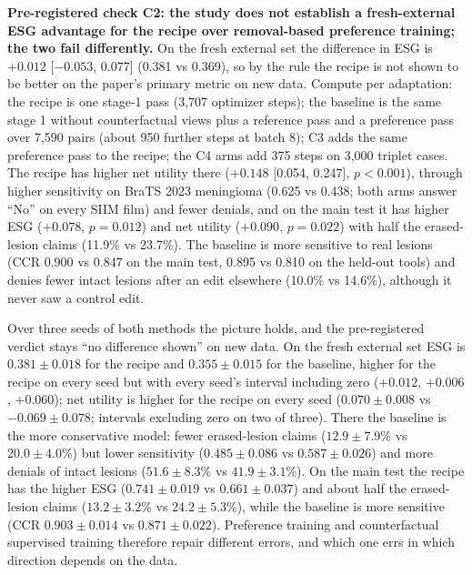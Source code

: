\documentclass[11pt]{article}
\begin{document}
\textbf{Pre-registered check C2: the study does not establish a fresh-external ESG advantage for the recipe over removal-based preference training; the two fail differently.} On the fresh external set the difference in ESG is $+0.012$ [$-0.053$, 0.077] (0.381 vs 0.369), so by the rule the recipe is not shown to be better on the paper's primary metric on new data. Compute per adaptation: the recipe is one stage-1 pass (3,707 optimizer steps); the baseline is the same stage 1 without counterfactual views plus a reference pass and a preference pass over 7,590 pairs (about 950 further steps at batch 8); C3 adds the same preference pass to the recipe; the C4 arms add 375 steps on 3,000 triplet cases. The recipe has higher net utility there ($+0.148$ [0.054, 0.247], $p<0.001$), through higher sensitivity on BraTS 2023 meningioma (0.625 vs 0.438; both arms answer ``No'' on every SIIM film) and fewer denials, and on the main test it has higher ESG ($+0.078$, $p=0.012$) and net utility ($+0.090$, $p=0.022$) with half the erased-lesion claims (11.9\% vs 23.7\%). The baseline is more sensitive to real lesions (CCR 0.900 vs 0.847 on the main test, 0.895 vs 0.810 on the held-out tools) and denies fewer intact lesions after an edit elsewhere (10.0\% vs 14.6\%), although it never saw a control edit.

Over three seeds of both methods the picture holds, and the pre-registered verdict stays ``no difference shown'' on new data. On the fresh external set ESG is $0.381\pm0.018$ for the recipe and $0.355\pm0.015$ for the baseline, higher for the recipe on every seed but with every seed's interval including zero ($+0.012$, $+0.006$, $+0.060$); net utility is higher for the recipe on every seed ($0.070\pm0.008$ vs $-0.069\pm0.078$; intervals excluding zero on two of three). There the baseline is the more conservative model: fewer erased-lesion claims ($12.9\pm7.9$\% vs $20.0\pm4.0$\%) but lower sensitivity ($0.485\pm0.086$ vs $0.587\pm0.026$) and more denials of intact lesions ($51.6\pm8.3$\% vs $41.9\pm3.1$\%). On the main test the recipe has the higher ESG ($0.741\pm0.019$ vs $0.661\pm0.037$) and about half the erased-lesion claims ($13.2\pm3.2$\% vs $24.2\pm5.3$\%), while the baseline is more sensitive (CCR $0.903\pm0.014$ vs $0.871\pm0.022$). Preference training and counterfactual supervised training therefore repair different errors, and which one errs in which direction depends on the data.
\end{document}
